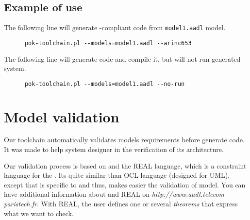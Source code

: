       \subsection{Example of use}
      The following line will generate \arinc-compliant code from
      \texttt{model1.aadl} model.
      \begin{verbatim}
      pok-toolchain.pl --models=model1.aadl --arinc653
      \end{verbatim}

      The following line will generate code and compile it, but will not run generated system.
      \begin{verbatim}
      pok-toolchain.pl --models=model1.aadl --no-run
      \end{verbatim}

   \section{Model validation}
   Our toolchain automatically validates models requirements before generate
   code. It was made to help system designer in the verification of its
   architecture.

   Our validation process is based on \ocarina and the REAL language, which is a
   constraint language for the \aadl. Its quite similar than OCL language
   (designed for UML), except that is specific to \aadl and thus, makes easier
   the validation of \aadl model. You can have additional information about
   \ocarina and REAL on \textit{http://www.aadl.telecom-paristech.fr}. With
   REAL, the user defines one or several \textit{theorems} that express what we
   want to check.

